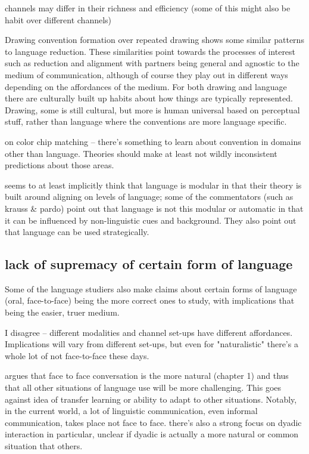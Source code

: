 \documentclass[]{article}
\begin{document}
channels may differ in their richness and efficiency (some of this might also be habit over different channels)

\cite{hawkinsa} Drawing convention formation over repeated drawing shows some similar patterns to language reduction. These similarities point towards the processes of interest such as reduction and alignment with partners being general and agnostic to the medium of communication, although of course they play out in different ways depending on the affordances of the medium. For both drawing and language there are culturally built up habits about how things are typically represented. Drawing, some is still cultural, but more is human universal based on perceptual stuff, rather than language where the conventions are more language specific. 

\cite{murthy2022} on color chip matching -- there's something to learn about convention in domains other than language. Theories should make at least not wildly inconsistent predictions about those areas. 

\cite{pickering2004} seems to at least implicitly think that language is modular in that their theory is built around aligning on levels of language; some of the commentators (such as krauss \& pardo) point out that language is not this modular or automatic in that it can be influenced by non-linguistic cues and background. They also point out that language can be used strategically. 

\subsection{lack of supremacy of certain form of language}
Some of the language studiers also make claims about certain forms of language (oral, face-to-face) being the more correct ones to study, with implications that being the easier, truer medium. 

I disagree -- different modalities and channel set-ups have different affordances. Implications will vary from different set-ups, but even for "naturalistic" there's a whole lot of not face-to-face these days. 

\cite{clark1996} argues that face to face conversation is the more natural (chapter 1) and thus that all other situations of language use will be more challenging. This goes against idea of transfer learning or ability to adapt to other situations. Notably, in the current world, a lot of linguistic communication, even informal communication, takes place not face to face. there's also a strong focus on dyadic interaction in particular, unclear if dyadic is actually a more natural or common situation that others.
\end{document}
